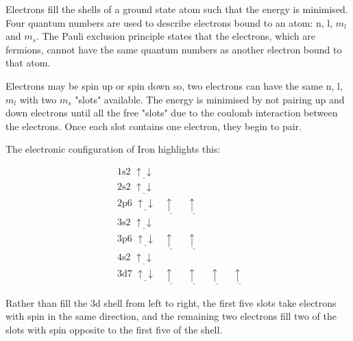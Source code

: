 Electrons fill the shells of a ground state atom such that the energy is minimised.  Four quantum numbers are used to describe electrons bound to an atom: n, l, $m_l$ and $m_s$.  The Pauli exclusion principle states that the electrons, which are fermions, cannot have the same quantum numbers as another electron bound to that atom.

Electrons may be spin up or spin down so, two electrons can have the same n, l, $m_l$ with two $m_s$ "slots" available.  The energy is minimised by not pairing up and down electrons until all the free "slots" due to the coulomb interaction between the electrons.  Once each slot contains one electron, they begin to pair.

The electronic configuration of Iron highlights this:

\begin{equation}
\begin{split}
&\text{1s2   } \underline{\uparrow \downarrow} \\
&\text{2s2   } \underline{\uparrow \downarrow} \\
&\text{2p6   } \underline{\uparrow \downarrow} \:\:\:\:  \underline{\uparrow \:\:} \:\:\:\:  \underline{\uparrow \:\:} \\
&\text{3s2   } \underline{\uparrow \downarrow} \\
&\text{3p6   } \underline{\uparrow \downarrow} \:\:\:\:  \underline{\uparrow \:\:} \:\:\:\:  \underline{\uparrow \:\:} \\
&\text{4s2   } \underline{\uparrow \downarrow} \\
&\text{3d7   } \underline{\uparrow \downarrow} \:\:\:\:  \underline{\uparrow \:\:} \:\:\:\:  \underline{\uparrow \:\:} \:\:\:\: \underline{\uparrow \:\:} \:\:\:\:  \underline{\uparrow \:\:}
\end{split}
\label{eq:eqSplineThreeEquations}
\end{equation}

Rather than fill the 3d shell from left to right, the first five slots take electrons with spin in the same direction, and the remaining two electrons fill two of the slots with spin opposite to the first five of the shell.

